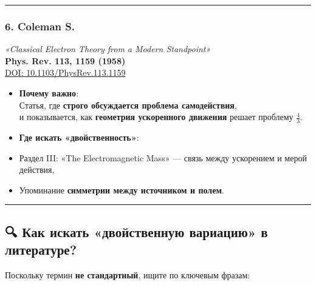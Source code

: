 \documentclass[11pt]{article}
\begin{document}
\begin{center}\rule{0.5\linewidth}{\linethickness}\end{center}

\subsubsection{\texorpdfstring{6. \textbf{Coleman
S.}}{6. Coleman S.}}\label{coleman-s.}

\emph{«Classical Electron Theory from a Modern Standpoint»}\\
\textbf{Phys. Rev. 113, 1159 (1958)}\\
\href{https://doi.org/10.1103/PhysRev.113.1159}{DOI:
10.1103/PhysRev.113.1159}

\begin{itemize}
\item
  \textbf{Почему важно}:\\
  Статья, где \textbf{строго обсуждается проблема самодействия},\\
  и показывается, как \textbf{геометрия ускоренного движения} решает
  проблему \(\frac{4}{3}\).
\item
  \textbf{Где искать «двойственность»}:\\
\item
  Раздел III: «The Electromagnetic Mass» --- связь между ускорением и
  мерой действия,\\
\item
  Упоминание \textbf{симметрии между источником и полем}.
\end{itemize}

\begin{center}\rule{0.5\linewidth}{\linethickness}\end{center}

\subsection{🔍 Как искать «двойственную вариацию» в
литературе?}\label{ux43aux430ux43a-ux438ux441ux43aux430ux442ux44c-ux434ux432ux43eux439ux441ux442ux432ux435ux43dux43dux443ux44e-ux432ux430ux440ux438ux430ux446ux438ux44e-ux432-ux43bux438ux442ux435ux440ux430ux442ux443ux440ux435}

Поскольку термин \textbf{не стандартный}, ищите по ключевым фразам:
\end{document}
